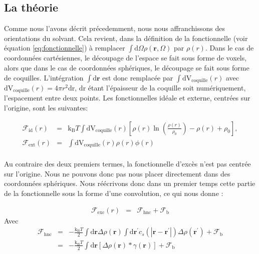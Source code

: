 \subsection{La théorie}
Comme nous l'avons décrit précedemment, nous nous affranchissons des orientations du solvant. Cela revient, dans la définition de la fonctionnelle (voir équation \ref{eq:fonctionnelle}) à remplacer $\int\mathrm{d}\Omega\rho(\boldsymbol{r}, \Omega)$ par $\rho(r)$. Dans le cas de coordonnées cartésiennes, le découpage de l'espace se fait sous forme de voxels, alors que dans le cas de coordonnées sphériques, le découpage se fait sous forme de coquilles. L'intégration $\int\mathrm{d}\boldsymbol{r}$ est donc remplacée par $\int\mathrm{dV}_{\mathrm{coquille}}(r)$ avec $\mathrm{dV}_{\mathrm{coquille}}(r)=4 \pi r^2 \mathrm{dr}$, $\mathrm{dr}$ étant l'épaisseur de la coquille soit numériquement, l'espacement entre deux points. Les fonctionnelles idéale et externe, centrées sur l'origine, sont les suivantes:

\begin{eqnarray}
\mathcal{F}_\mathrm{id}(r)&=&\mathrm{k_B}T\int\mathrm{dV}_{\mathrm{coquille}}(r) [ \rho\left(r \right)\ln\left(\frac{\rho\left(r \right)}{\rho_0}\right)-\rho\left(r \right)+\rho_0 ],\\
\mathcal{F}_\mathrm{ext}(r)&=&\int\mathrm{ dV}_{\mathrm{coquille}}(r)\rho\left(r \right)\phi\left(r \right)\\
\end{eqnarray}

Au contraire des deux premiers termes, la fonctionnelle d'excès n'est pas centrée sur l'origine. Nous ne pouvons donc pas nous placer directement dans des coordonnées sphériques. Nous réécrivons donc dans un premier temps cette partie de la fonctionnelle sous la forme d'une convolution, ce qui nous donne :

\begin{eqnarray}
\mathcal{F}_\mathrm{exc}(r) &=& \mathcal{F}_\mathrm{hnc} + \mathcal{F}_\mathrm{b}
\end{eqnarray}
Avec
\begin{eqnarray}
\mathcal{F}_\mathrm{hnc}&=& -\frac{\mathrm{k_B}T}{2}\int\mathrm{d}\boldsymbol{r} \Delta\rho\left(\boldsymbol{r} \right)  \int\mathrm{d}\boldsymbol{r}^\prime c_s\left(\left|\boldsymbol{r}-\boldsymbol{r}^\prime\right| \right) \Delta\rho\left(\boldsymbol{r}^\prime \right) + \mathcal{F}_\mathrm{b}\\
						 &=& -\frac{\mathrm{k_B}T}{2}\int\mathrm{d}\boldsymbol{r} [ \Delta\rho\left(\boldsymbol{r} \right)  *\gamma(\boldsymbol{r}) ] + \mathcal{F}_\mathrm{b}
\end{eqnarray}

